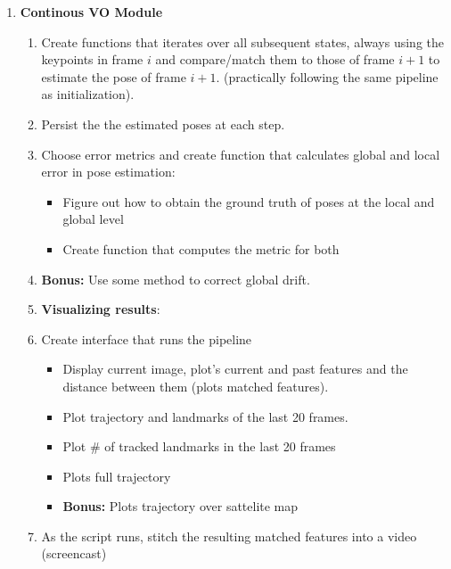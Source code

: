 \begin{enumerate}
    \item \textbf{Continous VO Module}
    \begin{enumerate}
        \item Create functions that iterates over all subsequent states, always using the keypoints in frame $i$ and compare/match them to those of frame $i+1$ to estimate the pose of frame $i+1$. (practically following the same pipeline as initialization).
        
        \item Persist the the estimated poses at each step.
        
        \item Choose error metrics and create function that calculates global and local error in pose estimation:
            \begin{itemize}
                \item Figure out how to obtain the ground truth of poses at the local and global level
                \item Create function that computes the metric for both
            \end{itemize}
        
        \item \textbf{Bonus:} Use some method to correct global drift.
        
    \item \textbf{Visualizing results}:
        \item Create interface that runs the pipeline 
            \begin{itemize}
                \item Display current image, plot's current and past features and the distance between them (plots matched features). 
                \item Plot trajectory and landmarks of the last 20 frames.
                \item Plot \# of tracked landmarks in the last 20 frames 
                \item Plots full trajectory
                \item \textbf{Bonus:} Plots trajectory over sattelite map
            \end{itemize}
            
        \item As the script runs, stitch the resulting matched features into a video (screencast)
        
    \end{enumerate}
    
\end{enumerate}

